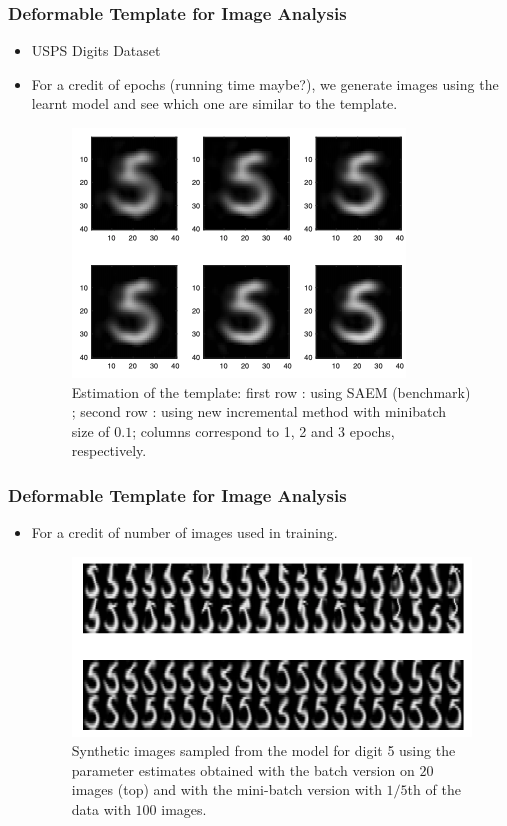 \documentclass[10pt]{beamer}
\begin{document}
\begin{frame}
\frametitle{Deformable Template for Image Analysis}
\begin{itemize}
\item USPS Digits Dataset
\item For a credit of epochs (running time maybe?), we generate images using the learnt model and see which one are similar to the template.

\begin{figure}[H]
\centering
\includegraphics[width=.5\textwidth]{images/deformable2}\vspace{-.3cm}
\caption{Estimation of the template: first row : using SAEM (benchmark) ; second row : using new incremental method with minibatch size of $0.1$; columns correspond to 1, 2 and 3 epochs, respectively.}
\label{fig:gmmplots}
\end{figure}

\end{itemize}
\end{frame}

\begin{frame}
\frametitle{Deformable Template for Image Analysis}
\begin{itemize}

\item For a credit of number of images used in training.
\begin{figure}[H]
\centering
\includegraphics[width=.8\textwidth]{images/deformable}\vspace{-.3cm}
\caption{Synthetic images sampled from the model for digit 5 using the parameter estimates obtained with the batch version
on $20$ images (top) and with the mini-batch version with $1/5$th of the data with $100$ images.}
\label{fig:gmmplots}
\end{figure}

\end{itemize}
\end{frame}
\end{document}
